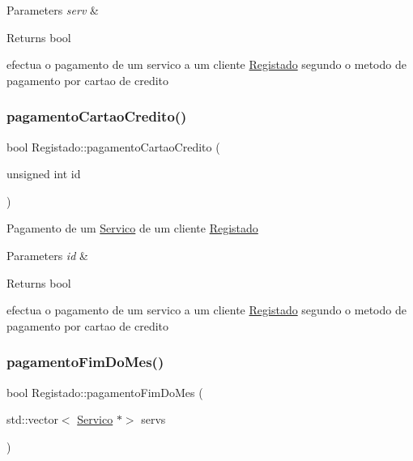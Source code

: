 \begin{DoxyParams}{Parameters}
{\em serv} & \\
\hline
\end{DoxyParams}
\begin{DoxyReturn}{Returns}
bool
\end{DoxyReturn}
efectua o pagamento de um servico a um cliente \hyperlink{class_registado}{Registado} segundo o metodo de pagamento por cartao de credito \hypertarget{class_registado_a957b62d73c6ea619fb29e63255e11b12}{}\label{class_registado_a957b62d73c6ea619fb29e63255e11b12} 
\subsubsection{\texorpdfstring{pagamento\+Cartao\+Credito()}{pagamentoCartaoCredito()}\hspace{0.1cm}{\footnotesize\ttfamily [2/2]}}
{\footnotesize\ttfamily bool Registado\+::pagamento\+Cartao\+Credito (\begin{DoxyParamCaption}\item[{unsigned int}]{id }\end{DoxyParamCaption})\hspace{0.3cm}{\ttfamily [virtual]}}

Pagamento de um \hyperlink{class_servico}{Servico} de um cliente \hyperlink{class_registado}{Registado}


\begin{DoxyParams}{Parameters}
{\em id} & \\
\hline
\end{DoxyParams}
\begin{DoxyReturn}{Returns}
bool
\end{DoxyReturn}
efectua o pagamento de um servico a um cliente \hyperlink{class_registado}{Registado} segundo o metodo de pagamento por cartao de credito \hypertarget{class_registado_a87218f9b1e1aa767c6c77b71f38cca55}{}\label{class_registado_a87218f9b1e1aa767c6c77b71f38cca55} 
\subsubsection{\texorpdfstring{pagamento\+Fim\+Do\+Mes()}{pagamentoFimDoMes()}\hspace{0.1cm}{\footnotesize\ttfamily [1/2]}}
{\footnotesize\ttfamily bool Registado\+::pagamento\+Fim\+Do\+Mes (\begin{DoxyParamCaption}\item[{std\+::vector$<$ \hyperlink{class_servico}{Servico} $\ast$$>$}]{servs }\end{DoxyParamCaption})\hspace{0.3cm}{\ttfamily [virtual]}}

